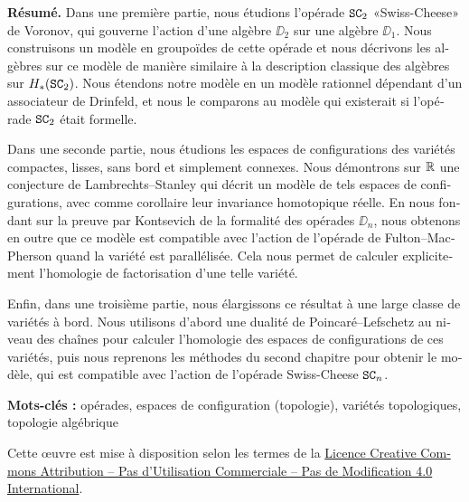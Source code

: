 \cleardoublepage
{}
{}
\begingroup
\small
\begin{french}
  \textbf{Résumé.}
  Dans une première partie, nous étudions l'opérade $\mathtt{SC}_{2}$ «Swiss-Cheese» de Voronov, qui gouverne l'action d'une algèbre $\DD_{2}$ sur une algèbre $\DD_{1}$.
  Nous construisons un modèle en groupoïdes de cette opérade et nous décrivons les algèbres sur ce modèle de manière similaire à la description classique des algèbres sur $H_{*}(\mathtt{SC}_{2})$.
  Nous étendons notre modèle en un modèle rationnel dépendant d'un associateur de Drinfeld, et nous le comparons au modèle qui existerait si l'opérade $\mathtt{SC}_{2}$ était formelle.

  Dans une seconde partie, nous étudions les espaces de configurations des variétés compactes, lisses, sans bord et simplement connexes.
  Nous démontrons sur $\mathbb{R}$ une conjecture de Lambrechts--Stanley qui décrit un modèle de tels espaces de configurations, avec comme corollaire leur invariance homotopique réelle.
  En nous fondant sur la preuve par Kontsevich de la formalité des opérades $\DD_{n}$, nous obtenons en outre que ce modèle est compatible avec l'action de l'opérade de Fulton--MacPherson quand la variété est parallélisée.
  Cela nous permet de calculer explicitement l'homologie de factorisation d'une telle variété.

  Enfin, dans une troisième partie, nous élargissons ce résultat à une large classe de variétés à bord.
  Nous utilisons d'abord une dualité de Poincaré--Lefschetz au niveau des chaînes pour calculer l'homologie des espaces de configurations de ces variétés, puis nous reprenons les méthodes du second chapitre pour obtenir le modèle, qui est compatible avec l'action de l'opérade Swiss-Cheese $\mathtt{SC}_{n}$.

  \noindent \textbf{Mots-clés : } opérades, espaces de configuration (topologie), variétés topologiques, topologie algébrique

  \noindent Cette œuvre est mise à disposition selon les termes de la \href{https://creativecommons.org/licenses/by-nc-nd/4.0/}{Licence Creative Commons Attribution -- Pas d'Utilisation Commerciale -- Pas de Modification 4.0 International}.
\end{french}
\disfrpt{}
\vfill

